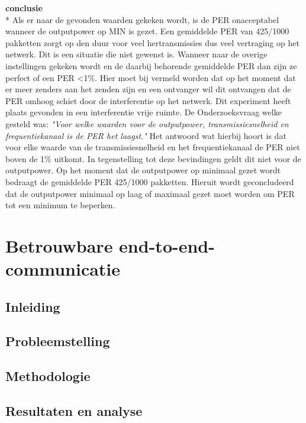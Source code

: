 \documentclass{article}
\begin{document}
\textbf {conclusie}  \\*
Als er naar de gevonden waarden gekeken wordt, is de PER onacceptabel wanneer de outputpower op MIN is gezet. Een gemiddelde PER van 425/1000 pakketten zorgt op den duur voor veel hertransmissies dus veel vertraging op het netwerk. Dit is een situatie die niet gewenst is. Wanneer naar de overige instellingen gekeken wordt en de daarbij behorende gemiddelde PER dan zijn ze perfect of een PER <1\%. Hier moet bij vermeld worden dat op het moment dat er meer zenders aan het zenden zijn en een ontvanger wil dit ontvangen dat de PER omhoog schiet door de interferentie op het netwerk. Dit experiment heeft plaats gevonden in een interferentie vrije ruimte.
De Onderzoeksvraag welke gesteld was: \textit{"Voor welke waarden voor de outputpower, transmissiesnelheid en frequentiekanaal is de PER het laagst."} Het antwoord wat hierbij hoort is dat voor elke waarde van de transmissiesnelheid en het frequentiekanaal de PER niet boven de 1\% uitkomt. In tegenstelling tot deze bevindingen geldt dit niet voor de outputpower. Op het moment dat de outputpower op minimaal gezet wordt bedraagt de gemiddelde PER 425/1000 pakketten. Hieruit wordt geconcludeerd dat de outputpower minimaal op laag of maximaal gezet moet worden om PER tot een minimum te beperken. 

\newpage

\clearpage
\section{Betrouwbare end-to-end-communicatie}
\subsection{Inleiding}
\subsection{Probleemstelling}
\subsection{Methodologie}
\subsection{Resultaten en analyse}
\clearpage
\appendix
\end{document}
